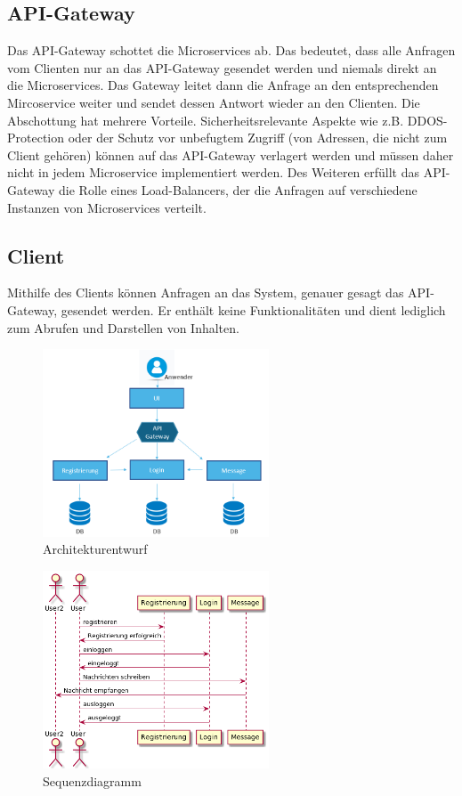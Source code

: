 \subsection{API-Gateway}
Das API-Gateway schottet die Microservices ab. Das bedeutet, dass alle Anfragen vom Clienten nur an das API-Gateway gesendet werden und niemals direkt an die Microservices. Das Gateway leitet dann die Anfrage an den entsprechenden Mircoservice weiter und sendet dessen Antwort wieder an den Clienten. Die Abschottung hat mehrere Vorteile. Sicherheitsrelevante Aspekte wie z.B. DDOS-Protection oder der Schutz vor unbefugtem Zugriff (von Adressen, die nicht zum Client gehören) können auf das API-Gateway verlagert werden und müssen daher nicht in jedem Microservice implementiert werden.
Des Weiteren erfüllt das API-Gateway die Rolle eines Load-Balancers, der die Anfragen auf verschiedene Instanzen von Microservices verteilt. 

\subsection{Client}
Mithilfe des Clients können Anfragen an das System, genauer gesagt das API-Gateway, gesendet werden. Er enthält keine Funktionalitäten und dient lediglich zum Abrufen und Darstellen von Inhalten.

\begin{figure}[bth] 
	\centering
	\includegraphics[width=0.6\textwidth]{Graphics/Architekturentwurf.png}
	\caption{Architekturentwurf}
	\label{entwurf}
\end{figure}

\begin{figure}[bth] 
	\centering
	\includegraphics[width=0.6\textwidth]{Graphics/Sequenzdiagramm.png}
	\caption{Sequenzdiagramm}
\end{figure}

